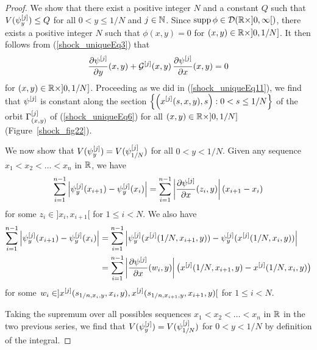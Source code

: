 \begin{proof}
We show that there exist a positive integer $N$ and a constant $Q$
such that $\displaystyle V(\psi^{[j]}_y) \leq Q$ for all
$0 < y \leq 1/N$ and $j \in \mathbb{N}$.
Since $\operatorname{supp} \phi \in \mathcal{D}(\mathbb{R}\times ]0,\infty[)$, there exists a
positive integer $N$ such that $\phi(x,y) = 0$ for
$(x,y) \in \mathbb{R} \times ]0,1/N]$.  It then follows from
(\ref{shock_uniqueEq3}) that
\[
\frac{\partial{\psi^{[j]}}}{\partial y}(x,y) + {\cal
  G}^{[j]}(x,y)\,\frac{\partial{\psi^{[j]}}}{\partial x}(x,y) = 0
\]
for $(x,y) \in \mathbb{R} \times ]0,1/N]$.  Proceeding as we did in
(\ref{shock_uniqueEq11}), we find that
$\displaystyle \psi^{[j]}$ is constant along the section
$\displaystyle \left\{ \left(x^{[j]}(s,x,y),s\right) : 0 < s \leq 1/N \right\}$
of the orbit $\displaystyle \Gamma_{(x,y)}^{[j]}$ of
(\ref{shock_uniqueEq6}) for all
$(x,y) \in \mathbb{R}\times ]0,1/N]$ (Figure~\ref{shock_fig22}).


We now show that $\displaystyle V(\psi^{[j]}_y) = V(\psi^{[j]}_{1/N})$ for all
$0 < y < 1/N$.   Given any sequence
$x_1 < x_2 < \ldots < x_n$ in $\mathbb{R}$, we have
\[
\sum_{i=1}^{n-1} \left|\psi^{[j]}_y(x_{i+1}) - \psi^{[j]}_y(x_i)\right|
= \sum_{i=1}^{n-1} \left|\frac{\partial{\psi^{[j]}}}{\partial x}(z_i,y)\right|
(x_{i+1}- x_i)
\]
for some $z_i \in ]x_i,x_{i+1}[$ for $1\leq i < N$.
We also have
\begin{align*}
\sum_{i=1}^{n-1} \left|\psi^{[j]}_y(x_{i+1}) - \psi^{[j]}_y(x_i)\right|
&= \sum_{i=1}^{n-1} \left|\psi^{[j]}_y(x^{[j]}(1/N,x_{i+1},y))
- \psi^{[j]}_y(x^{[j]}(1/N,x_i,y))\right| \\
&= \sum_{i=1}^{n-1} \left|\frac{\partial{\psi^{[j]}}}{\partial x}(w_i,y)\right|
\big(x^{[j]}(1/N,x_{i+1},y) - x^{[j]}(1/N,x_i,y)\big)
\end{align*}
for some
$\displaystyle w_i \in
]x^{[j]}(s_{1/n,x_i,y},x_i,y),x^{[j]}(s_{1/n,x_{i+1},y},x_{i+1},y)[$
for $1\leq i < N$.

Taking the supremum over all possibles sequences
$x_1 < x_2 < \ldots < x_n$ in $\mathbb{R}$ in the two previous series, we
find that $\displaystyle V(\psi^{[j]}_y) = V(\psi^{[j]}_{1/N})$ for $0<y<1/N$ by
definition of the integral.


\end{proof}
